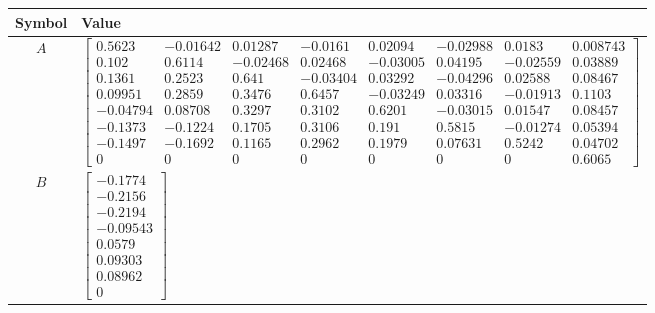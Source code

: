 \begin{tabular}{cl}
\hline
  Symbol  & Value                                                                                                                                                                                                                                                                                                                                                                                                                                                                                                                                                                                                                                    \\
\hline
   $A$    & $\left[\begin{matrix}0.5623 & -0.01642 & 0.01287 & -0.0161 & 0.02094 & -0.02988 & 0.0183 & 0.008743\\0.102 & 0.6114 & -0.02468 & 0.02468 & -0.03005 & 0.04195 & -0.02559 & 0.03889\\0.1361 & 0.2523 & 0.641 & -0.03404 & 0.03292 & -0.04296 & 0.02588 & 0.08467\\0.09951 & 0.2859 & 0.3476 & 0.6457 & -0.03249 & 0.03316 & -0.01913 & 0.1103\\-0.04794 & 0.08708 & 0.3297 & 0.3102 & 0.6201 & -0.03015 & 0.01547 & 0.08457\\-0.1373 & -0.1224 & 0.1705 & 0.3106 & 0.191 & 0.5815 & -0.01274 & 0.05394\\-0.1497 & -0.1692 & 0.1165 & 0.2962 & 0.1979 & 0.07631 & 0.5242 & 0.04702\\0 & 0 & 0 & 0 & 0 & 0 & 0 & 0.6065\end{matrix}\right]$ \\
   $B$    & $\left[\begin{matrix}-0.1774\\-0.2156\\-0.2194\\-0.09543\\0.0579\\0.09303\\0.08962\\0\end{matrix}\right]$                                                                                                                                                                                                                                                                                                                                                                                                                                                                                                                                \\

\end{tabular}
